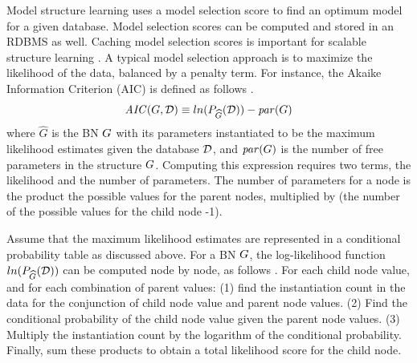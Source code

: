 \documentclass{acm_proc_article-sp}
\begin{document}
Model structure learning uses a model selection score to find an optimum model for a given database. Model selection scores can be computed and stored in an RDBMS as well. Caching model selection scores is important for scalable structure learning \cite{Russell2010}. A typical model selection approach is to maximize the likelihood of the data, balanced by a penalty term. For instance, the Akaike Information Criterion (AIC) is defined as follows \cite{Witten2005}.
\[
\mathit{AIC}(G,\mathcal{D}) \equiv ln(P_{\widehat{G}}(\mathcal{D})) - \mathit{par}(G) \]
where $\widehat{G}$ is the BN $G$ with its parameters instantiated to be the maximum likelihood estimates given the database $\mathcal{D}$, and $\mathit{par}(G)$ is the number of free parameters in the structure $G$. Computing this expression requires two terms, the likelihood and the number of parameters. The number of parameters for a node is the product the possible values for the parent nodes, multiplied by (the number of the possible values for the child node -1). 

Assume that the maximum likelihood estimates are represented in a conditional probability table as discussed above. For a BN $G$, the log-likelihood function $ln(P_{\widehat{G}}(\mathcal{D}))$ can be computed node by node, as follows \cite{Schulte2011}. For each child node value, and for each combination of parent values: (1) find the instantiation count in the data for the conjunction of child node value and parent node values. (2) Find the conditional probability of the child node value given the parent node values. (3) Multiply the instantiation count by the logarithm of the conditional probability. Finally, sum these products to obtain a total likelihood score for the child node.
\end{document}
